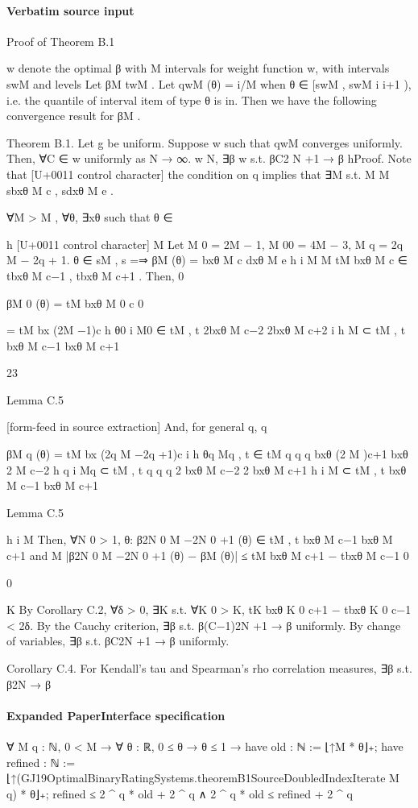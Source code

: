 \documentclass[10pt]{article}
\begin{document}
\paragraph{Verbatim source input}
\begin{ReviewVerbatim}
Proof of Theorem B.1

w denote the optimal β with M intervals for weight function w, with intervals swM and levels
Let βM
twM . Let qwM (θ) = i/M when θ ∈ [swM
, swM
i
i+1 ), i.e. the quantile of interval item of type θ is in.
Then we have the following convergence result for βM .

Theorem B.1. Let g be uniform. Suppose w such that qwM converges uniformly. Then, ∀C ∈
w uniformly as N → ∞.
w
N, ∃β w s.t. βC2
N +1 → β
hProof. Note that
[U+0011 control character] the condition on q implies that ∃M s.t.
M
M
sbxθ M c , sdxθ M e .

∀M > M , ∀θ, ∃xθ such that θ ∈

h
[U+0011 control character]
M
Let M 0 = 2M − 1, M 00 = 4M − 3, M q = 2q M − 2q + 1. θ ∈ sM
,
s
=⇒ βM (θ) =
bxθ M c dxθ M e
h
i
M
M
tM
bxθ M c ∈ tbxθ M c−1 , tbxθ M c+1 . Then,
0

βM 0 (θ) = tM
bxθ M 0 c
0

= tM
bx (2M −1)c
h θ0
i
M0
∈ tM
,
t
2bxθ M c−2 2bxθ M c+2
i
h
M
⊂ tM
,
t
bxθ M c−1 bxθ M c+1

23

Lemma C.5


[form-feed in source extraction]
And, for general q,
q

βM q (θ) = tM
bx (2q M −2q +1)c
i
h θq
Mq
,
t
∈ tM
q
q
q
bxθ (2 M )c+1
bxθ 2 M c−2
h q
i
Mq
⊂ tM
,
t
q
q
q
2 bxθ M c−2
2 bxθ M c+1
h
i
M
⊂ tM
,
t
bxθ M c−1 bxθ M c+1

Lemma C.5

h
i
M
Then, ∀N 0 > 1, θ: β2N 0 M −2N 0 +1 (θ) ∈ tM
,
t
bxθ M c−1 bxθ M c+1 and
M
|β2N 0 M −2N 0 +1 (θ) − βM (θ)| ≤ tM
bxθ M c+1 − tbxθ M c−1
0

0

K
By Corollary C.2, ∀δ > 0, ∃K s.t. ∀K 0 > K, tK
bxθ K 0 c+1 − tbxθ K 0 c−1 < 2δ.
By the Cauchy criterion, ∃β s.t. β(C−1)2N +1 → β uniformly.
By change of variables, ∃β s.t. βC2N +1 → β uniformly.

Corollary C.4. For Kendall’s tau and Spearman’s rho correlation measures, ∃β s.t. β2N → β
\end{ReviewVerbatim}



\paragraph{Expanded PaperInterface specification}
\begin{ReviewVerbatim}
∀ {M q : ℕ},
  0 < M →
    ∀ {θ : ℝ},
      0 ≤ θ →
        θ ≤ 1 →
          have old : ℕ := ⌊↑M * θ⌋₊;
          have refined : ℕ := ⌊↑(GJ19OptimalBinaryRatingSystems.theoremB1SourceDoubledIndexIterate M q) * θ⌋₊;
          refined ≤ 2 ^ q * old + 2 ^ q ∧ 2 ^ q * old ≤ refined + 2 ^ q
\end{ReviewVerbatim}
\end{document}
